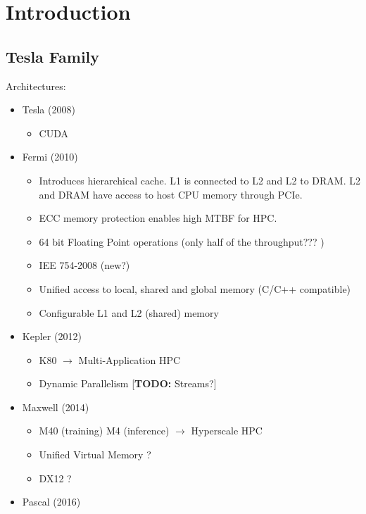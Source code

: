 
\section{Introduction}

\subsection{Tesla Family}
Architectures:
\begin{itemize}
    \item Tesla (2008)
        \begin{itemize}
            \item CUDA
        \end{itemize}
    \item Fermi (2010)
        \begin{itemize}
          \item Introduces hierarchical cache. L1 is connected to L2 and L2 to DRAM.
          L2 and DRAM have access to host CPU memory through PCIe.
          \item ECC memory protection enables high MTBF for HPC.
          \item 64 bit Floating Point operations (only half of the throughput??? \cite{nickolls2010gpu} )
          \item IEE 754-2008 (new?)
          \item Unified access to local, shared and global memory (C/C++ compatible)
          \item Configurable L1 and L2 (shared) memory
        \end{itemize}
    \item Kepler (2012)
        \begin{itemize}
            \item K80 $\rightarrow$ Multi-Application HPC
            \item Dynamic Parallelism [\textbf{TODO:} Streams?]
        \end{itemize}
    \item Maxwell (2014)
        \begin{itemize}
            \item M40 (training) M4 (inference) $\rightarrow$ Hyperscale HPC
            \item Unified Virtual Memory ?
            \item DX12 ?
        \end{itemize}
    \item Pascal (2016)
        \begin{itemize}

\end{itemize}
\end{itemize}
